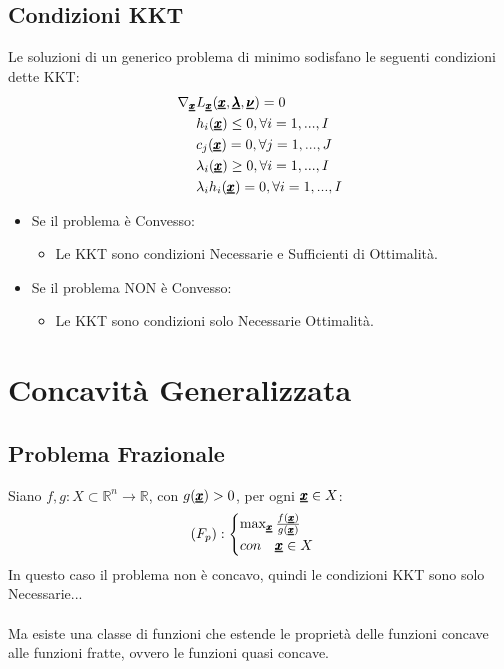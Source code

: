 \subsection{Condizioni KKT}
Le soluzioni di un generico problema di minimo sodisfano le seguenti condizioni dette KKT:
\begin{equation*}
    \begin{aligned}
    \nabla_{\pmb{\underline{x}}} &L_{\pmb{\underline{x}}}(\pmb{\underline{x}}, \pmb{\underline{\lambda}}, \pmb{\underline{\nu}} ) = 0 \\
    & h_i(\pmb{\underline{x}}) \leq 0, \forall i = 1,...,I \\
    & c_j(\pmb{\underline{x}}) = 0, \forall j = 1,..., J \\
    & \lambda_i(\pmb{\underline{x}}) \geq 0, \forall i = 1,..., I \\
    & \lambda_i h_i(\pmb{\underline{x}}) = 0, \forall i = 1,..., I \\
    \end{aligned}
\end{equation*}
\begin{itemize}
    \item Se il problema è Convesso:
    \begin{itemize}
        \item Le KKT sono condizioni Necessarie e Sufficienti di Ottimalità.
    \end{itemize}
    \item Se il problema NON è Convesso:
        \begin{itemize}
        \item Le KKT sono condizioni solo Necessarie Ottimalità.
    \end{itemize}
\end{itemize}


\section{Concavità Generalizzata}
\subsection{Problema Frazionale}
Siano $f, g : X \subset \mathbb{R}^n \longrightarrow \mathbb{R}$, con $g(\pmb{\underline{x}}) > 0$, per ogni $\pmb{\underline{x}} \in X$:
\begin{equation*}
    (F_p): \begin{cases}
    \max_{\pmb{\underline{x}}} \frac{f(\pmb{\underline{x}})}{g(\pmb{\underline{x}})} \\
    con \quad \pmb{\underline{x}} \in X
    \end{cases}
\end{equation*}
In questo caso il problema non è concavo, quindi le condizioni KKT sono solo Necessarie...\\ \\
Ma esiste una classe di funzioni che estende le proprietà delle funzioni concave alle funzioni fratte, ovvero le funzioni quasi concave.

